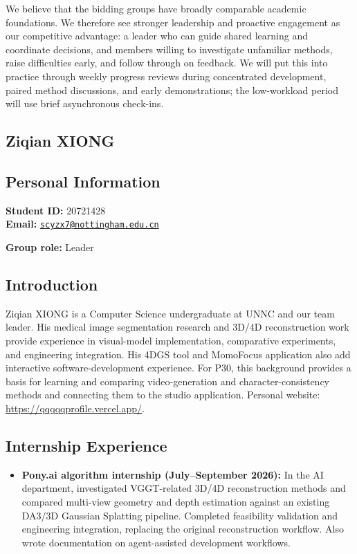 \documentclass[a4paper,12pt]{article}
\newcommand{\PersonalInformation}[2]{%
  \subsection*{Personal Information}
  \if\relax\detokenize{#1}\relax\else
  \noindent\textbf{Student ID:} #1\\
  \fi
  \textbf{Email:} #2\par
}
\begin{document}
We believe that the bidding groups have broadly comparable academic foundations. We therefore see stronger leadership and proactive engagement as our competitive advantage: a leader who can guide shared learning and coordinate decisions, and members willing to investigate unfamiliar methods, raise difficulties early, and follow through on feedback. We will put this into practice through weekly progress reviews during concentrated development, paired method discussions, and early demonstrations; the low-workload period will use brief asynchronous check-ins.

\subsection{Ziqian XIONG}
\PersonalInformation{20721428}{\href{mailto:scyzx7@nottingham.edu.cn}{\nolinkurl{scyzx7@nottingham.edu.cn}}}
\noindent\textbf{Group role:} Leader\par

\subsection*{Introduction}
Ziqian XIONG is a Computer Science undergraduate at UNNC and our team leader. His medical image segmentation research and 3D/4D reconstruction work provide experience in visual-model implementation, comparative experiments, and engineering integration. His 4DGS tool and MomoFocus application also add interactive software-development experience. For P30, this background provides a basis for learning and comparing video-generation and character-consistency methods and connecting them to the studio application. Personal website: \url{https://qqqqqprofile.vercel.app/}.

\subsection*{Internship Experience}
\begin{itemize}
  \item \textbf{Pony.ai algorithm internship (July--September 2026):} In the AI department, investigated VGGT-related 3D/4D reconstruction methods and compared multi-view geometry and depth estimation against an existing DA3/3D Gaussian Splatting pipeline. Completed feasibility validation and engineering integration, replacing the original reconstruction workflow. Also wrote documentation on agent-assisted development workflows.
\end{itemize}
\end{document}
